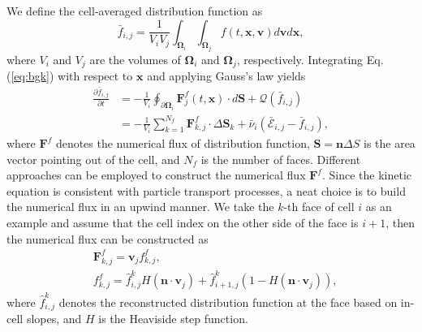 \documentclass[preprint,3p,12pt,sort&compress]{elsarticle}
\begin{document}
We define the cell-averaged distribution function as
\begin{equation}
    \bar f_{i,j}=\frac{1}{V_i V_j} \int_{\mathbf \Omega_{i}}\int_{\mathbf \Omega_{j}} f(t,\mathbf x,\mathbf v) d\mathbf v d\mathbf x,
\end{equation}
where $V_{i}$ and $V_{j}$ are the volumes of $\mathbf \Omega_{i}$ and $\mathbf \Omega_{j}$, respectively.
Integrating Eq.(\ref{eq:bgk}) with respect to $\mathbf x$ and applying Gauss's law yields 
\begin{equation}
\begin{aligned}
    \frac{\partial \bar f_{i,j}}{\partial t} &= -\frac{1}{V_{i}} \oint_{\partial \mathbf \Omega_i} \mathbf F^f_j(t,\mathbf x) \cdot d\mathbf S + \mathcal Q(\bar f_{i,j}) \\
    &= -\frac{1}{V_{i}} \sum_{k=1}^{N_f} \mathbf F_{k,j}^f \cdot \Delta \mathbf S_k + \bar \nu_i (\bar{\mathcal E}_{i,j} - \bar f_{i,j}),
\end{aligned}
\label{eq:fvm micro}
\end{equation}
where $\mathbf F^f$ denotes the numerical flux of distribution function, $\mathbf S=\mathbf n \Delta S$ is the area vector pointing out of the cell, and $N_f$ is the number of faces.
Different approaches can be employed to construct the numerical flux $\mathbf F^f$.
Since the kinetic equation is consistent with particle transport processes, a neat choice is to build the numerical flux in an upwind manner.
We take the $k$-th face of cell $i$ as an example and assume that the cell index on the other side of the face is $i+1$, then the numerical flux can be constructed as
\begin{equation}
\begin{aligned}
    &\mathbf F^f_{k,j} = \mathbf v_j f^f_{k,j}, \\
    &f_{k,j}^f = \hat f_{i,j}^k H(\mathbf n \cdot \mathbf v_j) + \hat f_{i+1,j}^k (1-H(\mathbf n \cdot \mathbf v_j)),
\end{aligned}
\label{eq:flux}
\end{equation}
where $\hat f_{i,j}^k$ denotes the reconstructed distribution function at the face based on in-cell slopes, and $H$ is the Heaviside step function.
\end{document}
